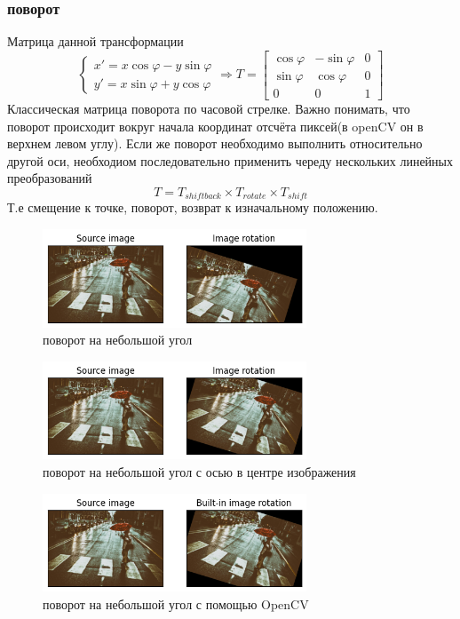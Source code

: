 \documentclass[a4paper,12pt]{article}
\begin{document}
\subsubsection{поворот}
Матрица данной трансформации
$$
	\begin{cases}
		x'=x \cos \varphi - y \sin \varphi \\
		y'=x \sin \varphi + y \cos \varphi
	\end{cases}
	\Rightarrow
	T=
	\begin{bmatrix}
		{\cos \varphi} & {-\sin \varphi} & 0
		\\ {\sin \varphi} & {\cos \varphi} & 0
		\\ 0 & 0 & 1
	\end{bmatrix}
$$
Классическая матрица поворота по часовой стрелке. Важно понимать, что поворот происходит вокруг начала координат отсчёта пиксей(в openCV он в верхнем левом углу). Если же поворот необходимо выполнить относительно другой оси, необходиом последовательно применить череду нескольких линейных преобразований
$$T = T_{shiftback} \times T_{rotate} \times T_{shift}$$
Т.е смещение к точке, поворот, возврат к изначальному положению.
\begin{figure}[H]
    \centering \includegraphics[width=0.7\textwidth]{my_images/18.png}
    \caption{поворот на небольшой угол}
\end{figure}
\begin{figure}[H]
    \centering \includegraphics[width=0.7\textwidth]{my_images/19.png}
    \caption{поворот на небольшой угол с осью в центре изображения}
\end{figure}
\begin{figure}[H]
    \centering \includegraphics[width=0.7\textwidth]{my_images/20.png}
    \caption{поворот на небольшой угол с помощью OpenCV}
\end{figure}
\end{document}
